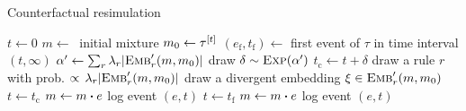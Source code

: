 \begin{algorithm}
\caption{Counterfactual resimulation}\label{alg:cosimulation}
\begin{spacing}{1.3}
\begin{algorithmic}[1]
\vspace{0.2cm}
\STATE $t \gets 0$
\STATE $m \gets\ $ initial mixture
  \STATE $m_0 \gets \tau^{[t]}$
  \STATE $(e_{\text{f}}, t_{\text{f}}) \gets $ first event of $\tau$ in time interval $(t, \infty)$
  \vspace{0.1cm}
  \STATE $\alpha' \gets \sum_r {\lambda_r |{\textsc{Emb}}'_{r}(m, m_0)|}$
  \vspace{0.1cm}
  \STATE draw $\delta \sim \textsc{Exp}(\alpha') $
  \STATE $t_{\text{c}} \gets t + \delta$
      \STATE draw a rule $r$ with prob.
      $\propto \, \lambda_r |{\textsc{Emb}}'_{r}(m, m_0)|$
      \STATE  draw a divergent embedding $\xi \in {\textsc{Emb}}'_{r}(m, m_0)$
          \STATE $t \gets t_{\text{c}}$
          \STATE $m \gets \UPDATE{m}{e}$
          \STATE log event $(e, t)$
      \ENDIF
  \ELSE
      \STATE $t \gets t_{\text{f}}$
          \STATE $m \gets \UPDATE{m}{e}$
          \STATE log event $(e, t)$
      
      \ENDIF 
  \ENDIF
\ENDWHILE
\vspace{0.1cm}
\end{algorithmic}
\end{spacing}
\end{algorithm}